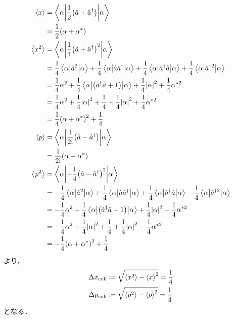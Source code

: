 \documentclass{report}
\begin{document}
    \begin{align}
      \ev{x} &= \mel**{\alpha}{\frac{1}{2}\qty(\hat{a} + \hat{a}^{\dag})}{\alpha} \\ 
      &= \frac{1}{2}\qty(\alpha + \alpha^*) \\ 
      \ev{x^2} &= \mel**{\alpha}{\frac{1}{4}\qty(\hat{a} + \hat{a}^{\dag})^2}{\alpha} \\ 
      &= \frac{1}{4}\mel**{\alpha}{\hat{a}^2}{\alpha} + \frac{1}{4}\mel**{\alpha}{\hat{a}\hat{a}^{\dag}}{\alpha} + \frac{1}{4}\mel**{\alpha}{\hat{a}^{\dag}\hat{a}}{\alpha} + \frac{1}{4}\mel**{\alpha}{\hat{a}^{\dag 2}}{\alpha} \\ 
      &= \frac{1}{4}\alpha^2 + \frac{1}{4}\mel**{\alpha}{\qty(\hat{a}^{\dag}\hat{a} + 1)}{\alpha} + \frac{1}{4}\abs{\alpha}^2 + \frac{1}{4}\alpha^{*2} \\ 
      &= \frac{1}{4}\alpha^2 + \frac{1}{4}\abs{\alpha}^2 + \frac{1}{4} + \frac{1}{4}\abs{\alpha}^2 + \frac{1}{4}\alpha^{*2} \\ 
      &= \frac{1}{4}\qty(\alpha + \alpha^*)^2 + \frac{1}{4} \\ 
      \ev{p} &= \mel**{\alpha}{\frac{1}{2\i}\qty(\hat{a} - \hat{a}^{\dag})}{\alpha} \\ 
      &= \frac{1}{2\i}\qty(\alpha - \alpha^*) \\ 
      \ev{p^2} &= \mel**{\alpha}{-\frac{1}{4}\qty(\hat{a} - \hat{a}^{\dag})^2}{\alpha} \\ 
      &= -\frac{1}{4}\mel**{\alpha}{\hat{a}^2}{\alpha} + \frac{1}{4}\mel**{\alpha}{\hat{a}\hat{a}^{\dag}}{\alpha} + \frac{1}{4}\mel**{\alpha}{\hat{a}^{\dag}\hat{a}}{\alpha} - \frac{1}{4}\mel**{\alpha}{\hat{a}^{\dag 2}}{\alpha} \\ 
      &= -\frac{1}{4}\alpha^2 + \frac{1}{4}\mel**{\alpha}{\qty(\hat{a}^{\dag}\hat{a} + 1)}{\alpha} + \frac{1}{4}\abs{\alpha}^2 - \frac{1}{4}\alpha^{* 2} \\ 
      &= -\frac{1}{4}\alpha^2 + \frac{1}{4}\abs{\alpha}^2 + \frac{1}{4} +\frac{1}{4}\abs{\alpha}^2 - \frac{1}{4}\alpha^{* 2} \\ 
      &= -\frac{1}{4}\qty(\alpha + \alpha^*)^2 + \frac{1}{4}
    \end{align}
    より，
    \begin{align}
      \Delta x_{\r{coh}} &\coloneqq \sqrt{\ev{x^2} - \ev{x}^2} = \frac{1}{4} \\ 
      \Delta p_{\r{coh}} &\coloneqq \sqrt{\ev{p^2} - \ev{p}^2} = \frac{1}{4}
    \end{align}
    となる．
\end{document}
